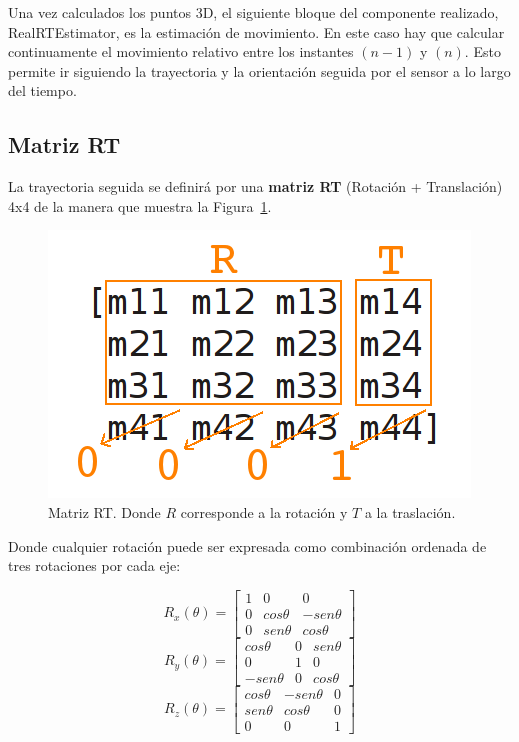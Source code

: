 Una vez calculados los puntos 3D, el siguiente bloque del componente realizado, RealRTEstimator, es la estimación de movimiento. En este caso hay que calcular continuamente el movimiento relativo entre los instantes $(n-1)$ y $(n)$. Esto permite ir siguiendo la trayectoria y la orientación seguida por el sensor a lo largo del tiempo.

\subsection{Matriz RT}

La trayectoria seguida se definirá por una \textbf{matriz RT} (Rotación + Translación) 4x4 de la manera que muestra la Figura~\ref{fig:matrixRT}.

\begin{figure}[th]
\centering
\includegraphics[scale=0.5]{Figures/matrixRT.png}
\decoRule
\caption[Matriz RT]{Matriz RT. Donde $R$ corresponde a la rotación y $T$ a la traslación.}
\label{fig:matrixRT}
\end{figure}

Donde cualquier rotación puede ser expresada como combinación ordenada de tres rotaciones por cada eje:

\begin{equation}
R_{x}(\theta)=\left[\begin{array}{ccc}
1 & 0 & 0\\
0 & cos\theta & -sen\theta\\
0 & sen\theta & cos\theta
\end{array}\right]
\end{equation}
\begin{equation}
R_{y}(\theta)=\left[\begin{array}{ccc}
cos\theta & 0 & sen\theta\\
0 & 1 & 0\\
-sen\theta & 0 & cos\theta
\end{array}\right]
\end{equation}
\begin{equation}
R_{z}(\theta)=\left[\begin{array}{ccc}
cos\theta & -sen\theta & 0\\
sen\theta & cos\theta & 0\\
0 & 0 & 1
\end{array}\right]
\end{equation}

